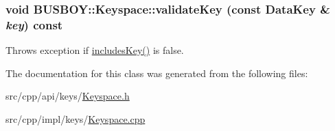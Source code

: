 \label{classBUSBOY_1_1Keyspace_a29cb418681c7d09801c6d833dd1ddae9}
\hypertarget{classBUSBOY_1_1Keyspace_ad12844863186fdf168f7399307471ccd}{
\subsubsection[{validateKey}]{\setlength{\rightskip}{0pt plus 5cm}void BUSBOY::Keyspace::validateKey (const {\bf DataKey} \& {\em key}) const}}
\label{classBUSBOY_1_1Keyspace_ad12844863186fdf168f7399307471ccd}


Throws exception if \hyperlink{classBUSBOY_1_1Keyspace_a76c9ccb68e6856806ef0099fd866cf0f}{includesKey()} is false. 

The documentation for this class was generated from the following files:\begin{DoxyCompactItemize}
\item 
src/cpp/api/keys/\hyperlink{Keyspace_8h}{Keyspace.h}\item 
src/cpp/impl/keys/\hyperlink{Keyspace_8cpp}{Keyspace.cpp}\end{DoxyCompactItemize}

